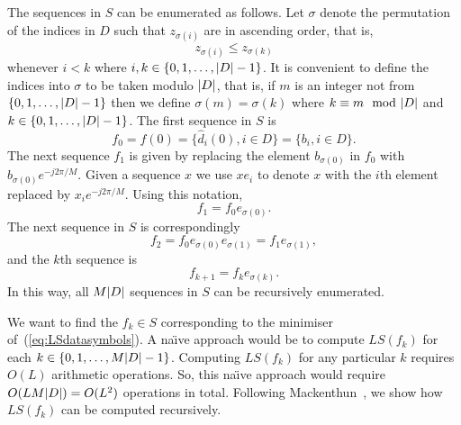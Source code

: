 \documentclass[journal]{IEEEtran}
\begin{document}
The sequences in $S$ can be enumerated as follows.  Let $\sigma$ denote the permutation of the indices in $D$ such that $z_{\sigma(i)}$ are in ascending order, that is,
\begin{equation}\label{eq:sigmasortind}
z_{\sigma(i)} \leq z_{\sigma(k)}
\end{equation}
whenever $i < k $ where $i, k \in \{0, 1, \dots, {\left\vert D \right\vert}-1\}$.  It is convenient to define the indices into $\sigma$ to be taken modulo ${\left\vert D \right\vert}$, that is, if $m$ is an integer not from $\{0, 1, \dots, {\left\vert D \right\vert}-1\}$ then we define $\sigma(m) = \sigma(k)$ where $k \equiv m \mod \abs{D}$ and $k \in  \{0, 1, \dots, {\left\vert D \right\vert}-1\}$.  The first sequence in $S$ is 
\[
f_0 = f(0) = \{ \hat{d}_i(0), i \in D \} = \{ b_i, i \in D \}.
\]  
The next sequence $f_1$ is given by replacing the element $b_{\sigma(0)}$ in $f_0$ with $b_{\sigma(0)}e^{-j2\pi/M}$.  Given a sequence $x$ we use $x e_i$ to denote $x$ with the $i$th element replaced by $x_i e^{-j2\pi/M}$.  Using this notation,  
\[
f_1 = f_0 e_{\sigma(0)}.
\] 
The next sequence in $S$ is correspondingly 
\[
f_2 = f_0 e_{\sigma(0)} e_{\sigma(1)} = f_1 e_{\sigma(1)},
\]
and the $k$th sequence is
\begin{equation}\label{eq:fkrec}
f_{k+1} = f_{k} e_{\sigma(k)}.
\end{equation}
In this way, all $M{\left\vert D \right\vert}$ sequences in $S$ can be recursively enumerated.

We want to find the $f_k \in S$ corresponding to the minimiser of~(\ref{eq:LSdatasymbols}).  A na\"{\i}ve approach would be to compute $LS(f_k)$ for each $k \in \{0,1,\dots,M{\left\vert D \right\vert}-1\}$.  Computing $LS(f_k)$ for any particular $k$ requires $O(L)$ arithmetic operations.  So, this na\"{\i}ve approach would require $O(L M {\left\vert D \right\vert}) = O(L^2)$ operations in total.  Following Mackenthun~\cite{Mackenthun1994}, we show how $LS(f_k)$ can be computed recursively.
\end{document}
